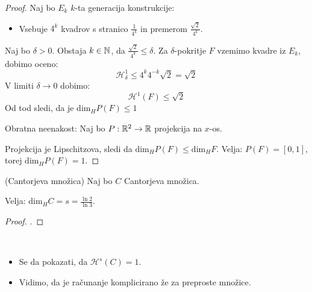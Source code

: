 \begin{proof}
    Naj bo \(E_k\) \(k\)-ta generacija konstrukcije:
    \begin{itemize}
        \item Vsebuje \(4^k\) kvadrov s stranico \(\frac{1}{4^k}\) in premerom \(\frac{\sqrt{2}}{4^k}\).
    \end{itemize}

    Naj bo \(\delta > 0\). Obstaja \(k \in \mathbb{N}\), da \(\frac{\sqrt{2}}{4^k} \leq \delta\). Za \(\delta\)-pokritje \(F\) vzemimo kvadre iz \(E_k\), dobimo oceno:
    \[\mathcal{H}^{1}_\delta \leq 4^k 4^{-k} \sqrt{2} = \sqrt{2}\]
    V limiti \(\delta \to 0\) dobimo:
    \[\mathcal{H}^{1}(F) \leq \sqrt{2}\]
    Od tod sledi, da je \(\text{dim}_H P(F) \leq 1\)

    Obratna neenakost: Naj bo \(P: \mathbb{R}^2 \to \mathbb{R}\) projekcija na \(x\)-os. 
    
    Projekcija je Lipschitzova, sledi da \(\text{dim}_H P(F) \leq \text{dim}_H F\). Velja: \(P(F) = [0,1]\), torej \(\text{dim}_H P(F) = 1\). \qedhere
\end{proof}

\begin{primer}(Cantorjeva množica)
    Naj bo \(C\) Cantorjeva množica.

    Velja: \(\text{dim}_H C = s = \frac{\ln2}{\ln3}\).
\end{primer}

\begin{proof}
    .
\end{proof}

\begin{opomba} \ 
    \begin{itemize}
        \item Se da pokazati, da \(\mathcal{H}^{s}(C) = 1\).
        \item Vidimo, da je računanje komplicirano že za preproste množice.
    \end{itemize}
\end{opomba}
